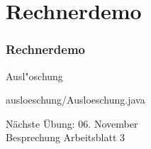 \documentclass[9pt,german]{beamer}%
\begin{document}
\def\stitle{Rechnerdemo}
\section{\stitle}
\begin{frame}[fragile]%
  \frametitle{\stitle}%
\medskip

Ausl"oschung

{ausloeschung/Ausloeschung.java}
\end{frame}


\setcounter{exercise}{8}


\setcounter{exercise}{9}


\begin{frame}
\centering
\Huge{}
\vspace{2cm}

{\LARGE
N\"achste \"Ubung: 06. November\\
Besprechung Arbeitsblatt 3
}
\end{frame}


\end{document}
